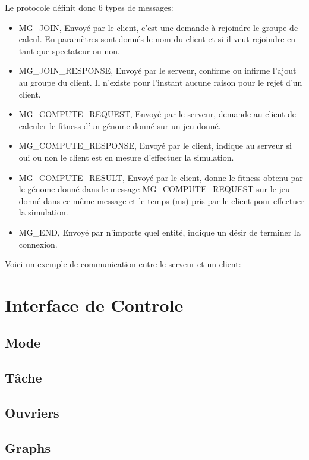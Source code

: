 \documentclass{article}
\begin{document}
Le protocole définit donc 6 types de messages:
\begin{itemize}
\item MG\_JOIN, Envoyé par le client, c'est une demande à rejoindre le groupe de calcul. En paramètres sont donnés le nom du client et si il veut rejoindre en tant que spectateur ou non.

\item MG\_JOIN\_RESPONSE, Envoyé par le serveur, confirme ou infirme l'ajout au groupe du client. Il n'existe pour l'instant aucune raison pour le rejet d'un client.

\item MG\_COMPUTE\_REQUEST, Envoyé par le serveur, demande au client de calculer le fitness d'un génome donné sur un jeu donné.

\item MG\_COMPUTE\_RESPONSE, Envoyé par le client, indique au serveur si oui ou non le client est en mesure d'effectuer la simulation.

\item MG\_COMPUTE\_RESULT, Envoyé par le client, donne le fitness obtenu par le génome donné dans le message MG\_COMPUTE\_REQUEST sur le jeu donné dans ce même message et le temps (ms) pris par le client pour effectuer la simulation.

\item MG\_END, Envoyé par n'importe quel entité, indique un désir de terminer la connexion.

\end{itemize}

Voici un exemple de communication entre le serveur et un client:

\newpage
\section{Interface de Controle}
\subsection{Mode}
\subsection{Tâche}
\subsection{Ouvriers}
\subsection{Graphs}
\end{document}
